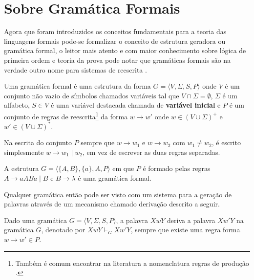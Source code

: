 \section{Sobre Gramática Formais}\label{sec:FormalGrammar}

Agora que foram introduzidos os conceitos fundamentais para a teoria das linguagens formais pode-se formalizar o conceito de estrutura geradora ou gramática formal, o leitor mais atento e com maior conhecimento sobre lógica de primeira ordem e teoria da prova \cite{avigad1998, buss1998} pode notar que gramáticas formais são na verdade outro nome para sistemas de reescrita \cite{ayala2014}.

\begin{definicao}\label{def:GramaticaFormal}
	Uma gramática formal é uma estrutura da forma $G = \langle V, \Sigma, S, P \rangle$ onde $V$ é um conjunto não vazio de símbolos chamados variáveis tal que $V \cap \Sigma = \emptyset$, $\Sigma$ é um alfabeto, $S \in V$ é uma variável destacada chamada de \textbf{variável inicial} e $P$ é um conjunto de regras de reescrita\footnote{Também é comum encontrar na literatura a nomenclatura regras de produção \cite{benjaLivro2010, linz2006}.} da forma $w \rightarrow w'$ onde $w \in (V \cup \Sigma)^+$ e $w' \in (V \cup \Sigma)^*$.
\end{definicao}

\begin{atencao}
	Na escrita do conjunto $P$ sempre que $w \rightarrow w_1$ e $w \rightarrow w_2$ com $w_1 \neq w_2$, é escrito simplesmente $w \rightarrow w_1 \mid w_2$, em vez de escrever as duas regras separadas.
\end{atencao}

\begin{exemplo}\label{exe:GramaticaFormal1}
	A estrutura $G = \langle \{A, B\}, \{a\}, A, P \rangle$ em que $P$ é formado pelas regras $A \rightarrow aABa \mid B$ e $B \rightarrow \lambda$ é uma gramática formal.
\end{exemplo}

Qualquer gramática então pode ser visto com um sistema para a geração de palavras através de um mecanismo chamado derivação descrito a seguir.

\begin{definicao}
	Dado uma gramática $G = \langle V, \Sigma, S, P \rangle$, a palavra $XwY$ deriva a palavra $Xw'Y$  na gramática $G$, denotado por $XwY \vdash_G Xw'Y$, sempre que existe uma regra forma $w \rightarrow w' \in P$.
\end{definicao}


